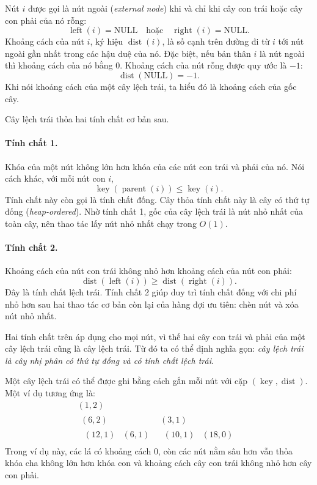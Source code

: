 \documentclass[11pt]{article}
\begin{document}
Nút \(i\) được gọi là nút ngoài (\emph{external node}) khi và chỉ khi cây con
trái hoặc cây con phải của nó rỗng:
\[
  \operatorname{left}(i)=\mathrm{NULL}
  \quad\text{hoặc}\quad
  \operatorname{right}(i)=\mathrm{NULL}.
\]
Khoảng cách của nút \(i\), ký hiệu \(\operatorname{dist}(i)\), là số cạnh trên
đường đi từ \(i\) tới nút ngoài gần nhất trong các hậu duệ của nó. Đặc biệt, nếu
bản thân \(i\) là nút ngoài thì khoảng cách của nó bằng \(0\). Khoảng cách của
nút rỗng được quy ước là \(-1\):
\[
  \operatorname{dist}(\mathrm{NULL})=-1.
\]
Khi nói khoảng cách của một cây lệch trái, ta hiểu đó là khoảng cách của gốc cây.

Cây lệch trái thỏa hai tính chất cơ bản sau.

\paragraph{Tính chất 1.}
Khóa của một nút không lớn hơn khóa của các nút con trái và phải của nó. Nói
cách khác, với mỗi nút con \(i\),
\[
  \operatorname{key}(\operatorname{parent}(i)) \le \operatorname{key}(i).
\]
Tính chất này còn gọi là tính chất đống. Cây thỏa tính chất này là cây có thứ
tự đống (\emph{heap-ordered}). Nhờ tính chất 1, gốc của cây lệch trái là nút nhỏ
nhất của toàn cây, nên thao tác lấy nút nhỏ nhất chạy trong \(O(1)\).

\paragraph{Tính chất 2.}
Khoảng cách của nút con trái không nhỏ hơn khoảng cách của nút con phải:
\[
  \operatorname{dist}(\operatorname{left}(i))
  \ge
  \operatorname{dist}(\operatorname{right}(i)).
\]
Đây là tính chất lệch trái. Tính chất 2 giúp duy trì tính chất đống với chi phí
nhỏ hơn sau hai thao tác cơ bản còn lại của hàng đợi ưu tiên: chèn nút và xóa
nút nhỏ nhất.

Hai tính chất trên áp dụng cho mọi nút, vì thế hai cây con trái và phải của một
cây lệch trái cũng là cây lệch trái. Từ đó ta có thể định nghĩa gọn:
\emph{cây lệch trái là cây nhị phân có thứ tự đống và có tính chất lệch trái}.

Một cây lệch trái có thể được ghi bằng cách gắn mỗi nút với cặp
\((\operatorname{key},\operatorname{dist})\). Một ví dụ tương ứng là:
\[
\begin{array}{c}
  (1,2)\\[0.2em]
  \begin{array}{cc}
    (6,2) & (3,1)\\
    \begin{array}{cc}
      (12,1) & (6,1)
    \end{array}
    &
    \begin{array}{cc}
      (10,1) & (18,0)
    \end{array}
  \end{array}
\end{array}
\]
Trong ví dụ này, các lá có khoảng cách \(0\), còn các nút nằm sâu hơn vẫn thỏa
khóa cha không lớn hơn khóa con và khoảng cách cây con trái không nhỏ hơn cây
con phải.
\end{document}
